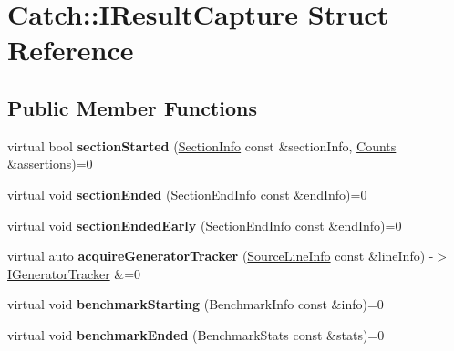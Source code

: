 \hypertarget{structCatch_1_1IResultCapture}{}\section{Catch\+:\+:I\+Result\+Capture Struct Reference}
\label{structCatch_1_1IResultCapture}
\subsection*{Public Member Functions}
\begin{DoxyCompactItemize}
\item 
\mbox{\label{structCatch_1_1IResultCapture_a5b76ed52badcb64cf374202e12b81a03}} 
virtual bool {\bfseries section\+Started} (\hyperlink{structCatch_1_1SectionInfo}{Section\+Info} const \&section\+Info, \hyperlink{structCatch_1_1Counts}{Counts} \&assertions)=0
\item 
\mbox{\label{structCatch_1_1IResultCapture_a4e152bc43dc0933684e31fa67a58195d}} 
virtual void {\bfseries section\+Ended} (\hyperlink{structCatch_1_1SectionEndInfo}{Section\+End\+Info} const \&end\+Info)=0
\item 
\mbox{\label{structCatch_1_1IResultCapture_afcc71eef8ca821ae132cced4a2be6988}} 
virtual void {\bfseries section\+Ended\+Early} (\hyperlink{structCatch_1_1SectionEndInfo}{Section\+End\+Info} const \&end\+Info)=0
\item 
\mbox{\label{structCatch_1_1IResultCapture_ab020d111e29ad1cabe1227dcfda712ef}} 
virtual auto {\bfseries acquire\+Generator\+Tracker} (\hyperlink{structCatch_1_1SourceLineInfo}{Source\+Line\+Info} const \&line\+Info) -\/$>$ \hyperlink{structCatch_1_1IGeneratorTracker}{I\+Generator\+Tracker} \&=0
\item 
\mbox{\label{structCatch_1_1IResultCapture_a264ae12330c74b2daae41715a30d51bf}} 
virtual void {\bfseries benchmark\+Starting} (Benchmark\+Info const \&info)=0
\item 
\mbox{\label{structCatch_1_1IResultCapture_a6e5e64f9d94211a888249012ab6cc7fb}} 
virtual void {\bfseries benchmark\+Ended} (Benchmark\+Stats const \&stats)=0

\end{DoxyCompactItemize}
